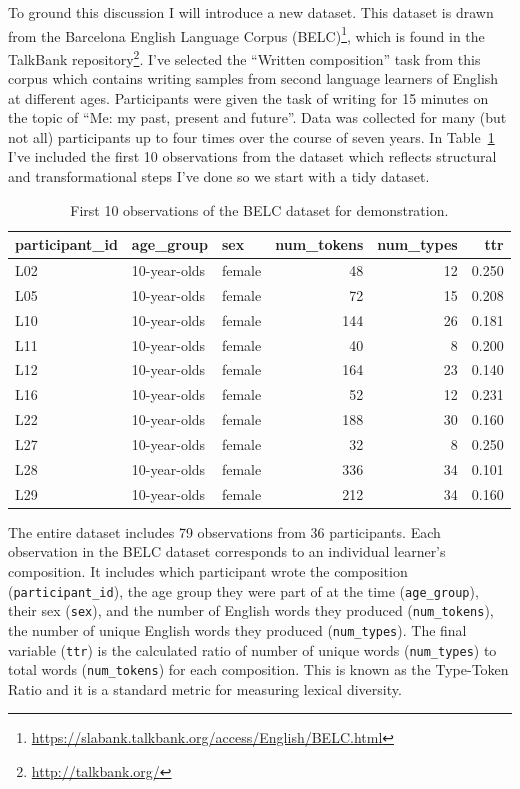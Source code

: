 \documentclass[
  letterpaper,
]{scrbook}
\DeclareRobustCommand{\href}[2]{#2\footnote{\url{#1}}}
\begin{document}
To ground this discussion I will introduce a new dataset. This dataset
is drawn from the
\href{https://slabank.talkbank.org/access/English/BELC.html}{Barcelona
English Language Corpus (BELC)}, which is found in the
\href{http://talkbank.org/}{TalkBank repository}. I've selected the
``Written composition'' task from this corpus which contains writing
samples from second language learners of English at different ages.
Participants were given the task of writing for 15 minutes on the topic
of ``Me: my past, present and future''. Data was collected for many (but
not all) participants up to four times over the course of seven years.
In Table~\ref{tbl-belc-overview} I've included the first 10 observations
from the dataset which reflects structural and transformational steps
I've done so we start with a tidy dataset.

\hypertarget{tbl-belc-overview}{}
\begin{table}
\caption{\label{tbl-belc-overview}First 10 observations of the BELC dataset for demonstration. }\tabularnewline

\centering
\begin{tabular}{l|l|l|r|r|r}
\hline
participant\_id & age\_group & sex & num\_tokens & num\_types & ttr\\
\hline
L02 & 10-year-olds & female & 48 & 12 & 0.250\\
\hline
L05 & 10-year-olds & female & 72 & 15 & 0.208\\
\hline
L10 & 10-year-olds & female & 144 & 26 & 0.181\\
\hline
L11 & 10-year-olds & female & 40 & 8 & 0.200\\
\hline
L12 & 10-year-olds & female & 164 & 23 & 0.140\\
\hline
L16 & 10-year-olds & female & 52 & 12 & 0.231\\
\hline
L22 & 10-year-olds & female & 188 & 30 & 0.160\\
\hline
L27 & 10-year-olds & female & 32 & 8 & 0.250\\
\hline
L28 & 10-year-olds & female & 336 & 34 & 0.101\\
\hline
L29 & 10-year-olds & female & 212 & 34 & 0.160\\
\hline
\end{tabular}
\end{table}

The entire dataset includes 79 observations from 36 participants. Each
observation in the BELC dataset corresponds to an individual learner's
composition. It includes which participant wrote the composition
(\texttt{participant\_id}), the age group they were part of at the time
(\texttt{age\_group}), their sex (\texttt{sex}), and the number of
English words they produced (\texttt{num\_tokens}), the number of unique
English words they produced (\texttt{num\_types}). The final variable
(\texttt{ttr}) is the calculated ratio of number of unique words
(\texttt{num\_types}) to total words (\texttt{num\_tokens}) for each
composition. This is known as the Type-Token Ratio and it is a standard
metric for measuring lexical diversity.
\end{document}
